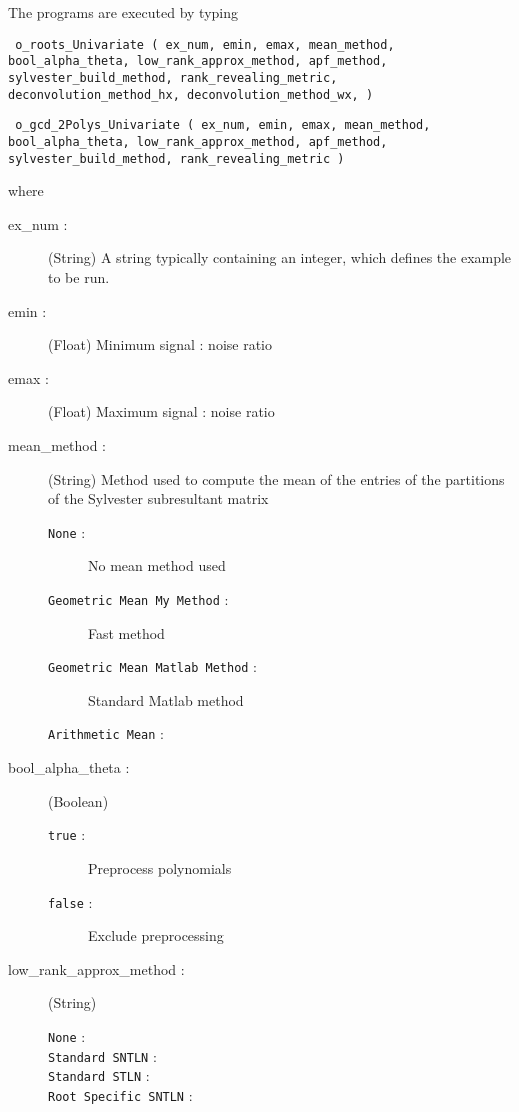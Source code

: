 \documentclass{article}
\begin{document}
The programs are executed by typing
%
%
\begin{center}
\texttt
	{
	o\_roots\_Univariate
	(
		ex\_num, 
		emin, 
		emax, 
		mean\_method, 
		bool\_alpha\_theta, 
		low\_rank\_approx\_method, 
		apf\_method, 
		sylvester\_build\_method,
		rank\_revealing\_metric,
		deconvolution\_method\_hx,
		deconvolution\_method\_wx,
	)
	}

\texttt
	{
	o\_gcd\_2Polys\_Univariate
	(
		ex\_num, 
		emin, 
		emax, 
		mean\_method, 
		bool\_alpha\_theta, 
		low\_rank\_approx\_method, 
		apf\_method, 
		sylvester\_build\_method,
		rank\_revealing\_metric
	)}
\end{center}
%
 where
%
\begin{description}

	\item[ex\_num : ]
	(String) A string typically containing an integer, which defines the example to be run.
	
	\item[{emin} : ] (Float) Minimum signal : noise ratio
	
	\item[{emax} : ] (Float) Maximum signal : noise ratio
	
	\item[{mean\_method} : ] (String) Method used to compute the mean of the entries of the partitions of the Sylvester subresultant matrix
		\begin{description}
			\item[\texttt{None} : ] No mean method used
			\item[\texttt{Geometric Mean My Method} : ] Fast method 
			\item[\texttt{Geometric Mean Matlab Method} : ] Standard Matlab method
			\item[\texttt{Arithmetic Mean} : ] 
		\end{description} 

	
	\item[{bool\_alpha\_theta} : ] (Boolean)
		\begin{description}
			\item[\texttt{true} : ]  Preprocess polynomials
			\item[\texttt{false} : ]  Exclude preprocessing 
		\end{description}


	
	\item[{low\_rank\_approx\_method} : ] (String)
		\begin{description}
			\item[\texttt{None} : ] 
			\item[\texttt{Standard SNTLN} : ] 
			\item[\texttt{Standard STLN} : ]
			\item[\texttt{Root Specific SNTLN} : ] 
		\end{description}
	

\end{description}
\end{document}

